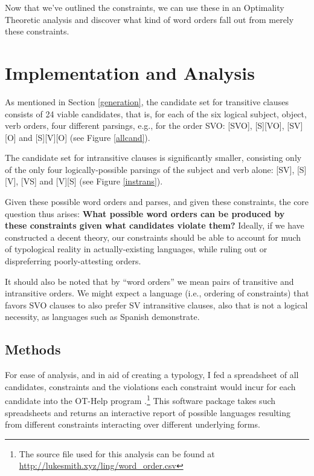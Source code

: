 \documentclass{article}
\begin{document}
 Now that we've outlined the constraints, we can use these in an Optimality Theoretic analysis and discover what kind of word orders fall out from merely these constraints.

\section{Implementation and Analysis}


As mentioned in Section \ref{generation}, the candidate set for transitive clauses consists of 24 viable candidates, that is, for each of the six logical subject, object, verb orders, four different parsings, e.g., for the order SVO: [SVO], [S][VO], [SV][O] and [S][V][O] (see Figure \ref{allcand}).

The candidate set for intransitive clauses is significantly smaller, consisting only of the only four logically-possible parsings of the subject and verb alone: [SV], [S][V], [VS] and [V][S] (see Figure \ref{instrans}).

Given these possible word orders and parses, and given these constraints, the core question thus arises: \textbf{What possible word orders  can be produced by these constraints given what candidates violate them?}
Ideally, if we have constructed a decent theory, our constraints should be able to account for much of typological reality in actually-existing languages, while ruling out or dispreferring poorly-attesting orders.

It should also be noted that by ``word orders'' we mean pairs of transitive and intransitive orders.
We might expect a language (i.e., ordering of constraints) that favors SVO clauses to also prefer SV intransitive clauses, also that is not a logical necessity, as languages such as Spanish demonstrate.

\subsection{Methods}

For ease of analysis, and in aid of creating a typology, I fed a spreadsheet of all candidates, constraints and the violations each constraint would incur for each candidate into the OT-Help program \parencite{othelp}.\footnote{The source file used for this analysis can be found at \href{http://lukesmith.xyz/ling/word_order.csv}{http://lukesmith.xyz/ling/word\_order.csv}} This software package takes such spreadsheets and returns an interactive report of possible languages resulting from different constraints interacting over different underlying forms.
\end{document}
